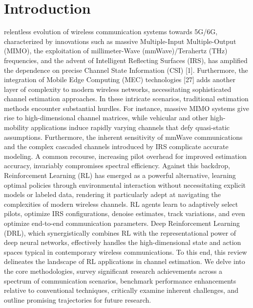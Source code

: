 \documentclass[journal,twocolumn]{IEEEtran}
\begin{document}
%
\IEEEpeerreviewmaketitle



\section{Introduction}

 relentless evolution of wireless communication systems towards 5G/6G, characterized by innovations such as massive Multiple-Input Multiple-Output (MIMO), the exploitation of millimeter-Wave (mmWave)/Terahertz (THz) frequencies, and the advent of Intelligent Reflecting Surfaces (IRS), has amplified the dependence on precise Channel State Information (CSI) [1]. Furthermore, the integration of Mobile Edge Computing (MEC) technologies [27] adds another layer of complexity to modern wireless networks, necessitating sophisticated channel estimation approaches. In these intricate scenarios, traditional estimation methods encounter substantial hurdles. For instance, massive MIMO systems give rise to high-dimensional channel matrices, while vehicular and other high-mobility applications induce rapidly varying channels that defy quasi-static assumptions. Furthermore, the inherent sensitivity of mmWave communications and the complex cascaded channels introduced by IRS complicate accurate modeling. A common recourse, increasing pilot overhead for improved estimation accuracy, invariably compromises spectral efficiency. Against this backdrop, Reinforcement Learning (RL) has emerged as a powerful alternative, learning optimal policies through environmental interaction without necessitating explicit models or labeled data, rendering it particularly adept at navigating the complexities of modern wireless channels. RL agents learn to adaptively select pilots, optimize IRS configurations, denoise estimates, track variations, and even optimize end-to-end communication parameters. Deep Reinforcement Learning (DRL), which synergistically combines RL with the representational power of deep neural networks, effectively handles the high-dimensional state and action spaces typical in contemporary wireless communications. To this end, this review delineates the landscape of RL applications in channel estimation. We delve into the core methodologies, survey significant research achievements across a spectrum of communication scenarios, benchmark performance enhancements relative to conventional techniques, critically examine inherent challenges, and outline promising trajectories for future research.
\end{document}
